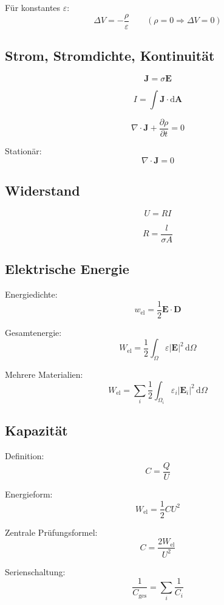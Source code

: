 \documentclass[a4paper]{article}
\begin{document}
Für konstantes $\varepsilon$:
\[
\Delta V = -\frac{\rho}{\varepsilon}
\qquad
(\rho = 0 \Rightarrow \Delta V = 0)
\]

\subsection{Strom, Stromdichte, Kontinuität}

\[
\mathbf{J} = \sigma \mathbf{E}
\]

\[
I = \int \mathbf{J}\cdot \mathrm d\mathbf{A}
\]

\[
\nabla \cdot \mathbf{J} + \frac{\partial \rho}{\partial t} = 0
\]

Stationär:
\[
\nabla \cdot \mathbf{J} = 0
\]

\subsection{Widerstand}

\[
U = RI
\]

\[
R = \frac{l}{\sigma A}
\]

\subsection{Elektrische Energie}

Energiedichte:
\[
w_\mathrm{el} = \frac{1}{2}\mathbf{E}\cdot\mathbf{D}
\]

Gesamtenergie:
\[
W_\mathrm{el}
=
\frac{1}{2}
\int_\Omega
\varepsilon |\mathbf{E}|^2
\,\mathrm d\Omega
\]

Mehrere Materialien:
\[
W_\mathrm{el}
=
\sum_i
\frac{1}{2}
\int_{\Omega_i}
\varepsilon_i |\mathbf{E}_i|^2
\,\mathrm d\Omega
\]

\subsection{Kapazität}

Definition:
\[
C = \frac{Q}{U}
\]

Energieform:
\[
W_\mathrm{el} = \frac{1}{2} C U^2
\]

Zentrale Prüfungsformel:
\[
\boxed{
C = \frac{2W_\mathrm{el}}{U^2}
}
\]

Serienschaltung:
\[
\frac{1}{C_\mathrm{ges}} = \sum_i \frac{1}{C_i}
\]
\end{document}

